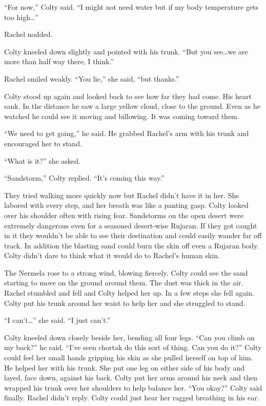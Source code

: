 ``For now,'' Colty said. ``I might not need water but if my body temperature gets too
high\ldots''

Rachel nodded.

Colty kneeled down slightly and pointed with his trunk. ``But you see\ldots we are more than
half way there, I think.''

Rachel smiled weakly. ``You lie,'' she said, ``but thanks.''

Colty stood up again and looked back to see how far they had come. His heart sank. In the
distance he saw a large yellow cloud, close to the ground. Even as he watched he could see it
moving and billowing. It was coming toward them.

``We need to get going,'' he said. He grabbed Rachel's arm with his trunk and encouraged her to
stand.

``What is it?'' she asked.

``Sandstorm,'' Colty replied. ``It's coming this way.''

They tried walking more quickly now but Rachel didn't have it in her. She labored with every
step, and her breath was like a panting gasp. Colty looked over his shoulder often with rising
fear. Sandstorms on the open desert were extremely dangerous even for a seasoned desert-wise
Rujaran. If they got caught in it they wouldn't be able to see their destination and could
easily wander far off track. In addition the blasting sand could burn the skin off even a
Rujaran body. Colty didn't dare to think what it would do to Rachel's human skin.

The Nermela rose to a strong wind, blowing fiercely. Colty could see the sand starting to move
on the ground around them. The dust was thick in the air. Rachel stumbled and fell and Colty
helped her up. In a few steps she fell again. Colty put his trunk around her waist to help her
and she struggled to stand.

``I can't\ldots'' she said. ``I just can't.''

Colty kneeled down closely beside her, bending all four legs. ``Can you climb on my back?'' he
said. ``I've seen chortak do this sort of thing. Can you do it?'' Colty could feel her small
hands gripping his skin as she pulled herself on top of him. He helped her with his trunk. She
put one leg on either side of his body and layed, face down, against his back. Colty put her
arms around his neck and then wrapped his trunk over her shoulders to help balance her. ``You
okay?'' Colty said finally. Rachel didn't reply. Colty could just hear her ragged breathing in
his ear.

